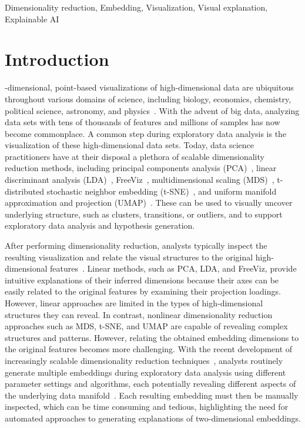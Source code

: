 \documentclass[lettersize,journal]{IEEEtran}
\begin{document}
\begin{IEEEkeywords}
Dimensionality reduction, Embedding, Visualization, Visual explanation, Explainable AI
\end{IEEEkeywords}

\section{Introduction}
-dimensional, point-based visualizations of high-dimensional data are ubiquitous throughout various domains of science, including biology, economics, chemistry, political science, astronomy, and physics~\cite{Liu2017}.
With the advent of big data, analyzing data sets with tens of thousands of features and millions of samples has now become commonplace.
A common step during exploratory data analysis is the visualization of these high-dimensional data sets. 
Today, data science practitioners have at their disposal a plethora of scalable dimensionality reduction methods, including principal components analysis (PCA)~\cite{Jolliffe2002}, linear discriminant analysis (LDA)~\cite{Fisher1936}, FreeViz~\cite{Demsar2007}, multidimensional scaling (MDS)~\cite{Kruskal1978}, t-distributed stochastic neighbor embedding (t-SNE)~\cite{Maaten2008}, and uniform manifold approximation and projection (UMAP)~\cite{McInnes2018}.
These can be used to visually uncover underlying structure, such as clusters, transitions, or outliers, and to support exploratory data analysis and hypothesis generation.

After performing dimensionality reduction, analysts typically inspect the resulting visualization and relate the visual structures to the original high-dimensional features~\cite{Kandogan2012,ChengMueller2016,Bibal2021}.
Linear methods, such as PCA, LDA, and FreeViz, provide intuitive explanations of their inferred dimensions because their axes can be easily related to the original features by examining their projection loadings. However, linear approaches are limited in the types of high-dimensional structures they can reveal.
In contrast, nonlinear dimensionality reduction approaches such as MDS, t-SNE, and UMAP are capable of revealing complex structures and patterns. However, relating the obtained embedding dimensions to the original features becomes more challenging.
With the recent development of increasingly scalable dimensionality reduction techniques~\cite{McInnes2018,Linderman2019,Lambert2022}, analysts routinely generate multiple embeddings during exploratory data analysis using different parameter settings and algorithms, each potentially revealing different aspects of the underlying data manifold~\cite{Kobak2019}.
Each resulting embedding must then be manually inspected, which can be time consuming and tedious, highlighting the need for automated approaches to generating explanations of two-dimensional embeddings.
\end{document}
